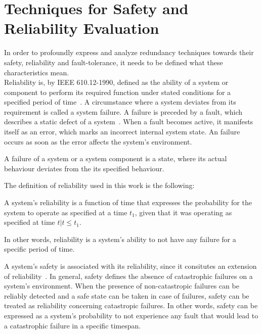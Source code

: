 \section{Techniques for Safety and Reliability Evaluation}
\label{sec:techniquesSafetyReliability}
In order to profoundly express and analyze redundancy techniques towards their safety, reliability and fault-tolerance, it needs to be defined what these characteristics mean.
\\

Reliability is, by IEEE 610.12-1990, defined as the ability of a system or component to perform its required function under stated conditions for a specified period of time~\cite{ieee610.12}.
A circumstance where a system deviates from its requirement is called a system failure.
A failure is preceded by a fault, which describes a static defect of a system~\cite{AmmannOffutt2016}.
When a fault becomes active, it manifests itself as an error, which marks an incorrect internal system state.
An failure occurs as soon as the error affects the system's environment.

\begin{definition}
A failure of a system or a system component is a state, where its actual behaviour deviates from the its specified behaviour.
\end{definition}

The definition of reliability used in this work is the following:

\begin{definition}
A system's reliability is a function of time that expresses the probability for the system to operate as specified at a time $t_1$, given that it was operating as specified at time $t | t \leq t_1$.
\end{definition}

In other words, reliability is a system's ability to not have any failure for a specific period of time.

A system's safety is associated with its reliability, since it consitutes an extension of reliability~\cite{AvizienisDependability2001}.
In general, safety defines the absence of catastrophic failures on a system's environment.
When the presence of non-catastropic failures can be reliably detected and a safe state can be taken in case of failures, safety can be treated as reliability concerning catastropic failures.
In other words, safety can be expressed as a system's probability to not experience any fault that would lead to a catastrophic failure in a specific timespan.

